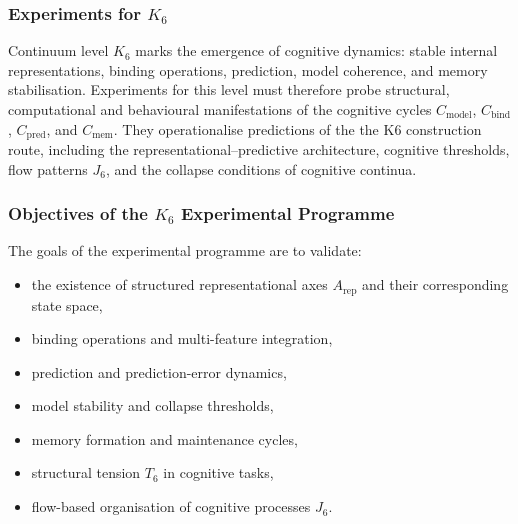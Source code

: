 
\subsubsection{Experiments for \texorpdfstring{$K_6$}{K_6}}
\label{sec:experiments-k6}

Continuum level $K_6$ marks the emergence of cognitive dynamics:
stable internal representations, binding operations, prediction,
model coherence, and memory stabilisation.  
Experiments for this level must therefore probe structural,
computational and behavioural manifestations of the cognitive
cycles $C_{\mathrm{model}}$, $C_{\mathrm{bind}}$,
$C_{\mathrm{pred}}$, and $C_{\mathrm{mem}}$.
They operationalise predictions of the the K6 construction route, including
the representational–predictive architecture, cognitive thresholds,
flow patterns $J_6$, and the collapse conditions of cognitive continua.



\subsubsection{Objectives of the \texorpdfstring{$K_6$}{K_6} Experimental Programme}

The goals of the experimental programme are to validate:

\begin{itemize}
    \item the existence of structured representational axes 
          $A_{\mathrm{rep}}$ and their corresponding state space,
    \item binding operations and multi-feature integration,
    \item prediction and prediction-error dynamics,
    \item model stability and collapse thresholds,
    \item memory formation and maintenance cycles,
    \item structural tension $T_6$ in cognitive tasks,
    \item flow-based organisation of cognitive processes $J_6$.
\end{itemize}



